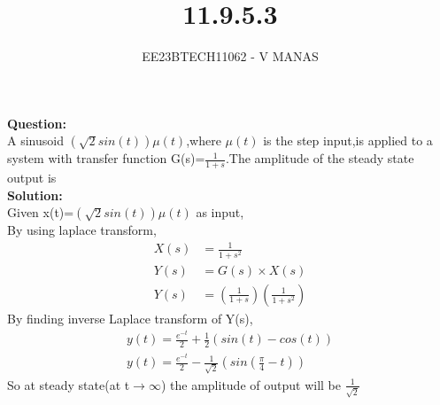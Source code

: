 \documentclass[journal,12pt,twocolumn]{IEEEtran}
\theoremstyle{remark}
\begin{document}

\vspace{3cm}

\title{11.9.5.3}
\author{EE23BTECH11062 - V MANAS}
\maketitle
\newpage

\bigskip
\textbf{Question:}\\A sinusoid $(\sqrt{2}sin(t))\mu(t)$,where $\mu(t)$ is the step input,is applied to a system with transfer function G(s)=$\frac{1}{1+s}$.The amplitude of the steady state output is\\
\textbf{Solution:}\\
Given x(t)=$(\sqrt{2}sin(t))\mu(t)$ as input,\\
By using laplace transform,
\begin{align}
    X(s)&=\frac{1}{1+s^2}\\
    Y(s)&=G(s)\times X(s)\\
    Y(s)&=(\frac{1}{1+s})(\frac{1}{1+s^2})
\end{align}
By finding inverse Laplace transform of Y(s),
\begin{align}
    y(t)=\frac{e^{-t}}{2}+\frac{1}{2}(sin(t)-cos(t))\\
    y(t)=\frac{e^{-t}}{2}-\frac{1}{\sqrt{2}}(sin(\frac{\pi}{4}-t))
\end{align}
So at steady state(at t$\rightarrow\infty$) the amplitude of output will be $\frac{1}{\sqrt{2}}$
\end{document}
